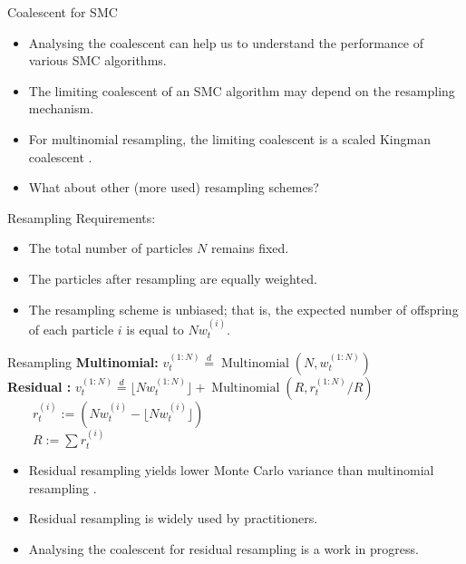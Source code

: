 \documentclass[aspectratio=169]{beamer}
\theoremstyle{definition}
\newcommand{\eqdist}{\overset{d}{=}}
\newcommand{\vt}[2][t]{v_{#1}^{(#2)}}
\newcommand{\wt}[2][t]{w_{#1}^{(#2)}}
\begin{document}
\begin{frame}{Coalescent for SMC}
\begin{itemize}
\item Analysing the coalescent can help us to understand the performance of various SMC algorithms.
\item The limiting coalescent of an SMC algorithm may depend on the resampling mechanism.
\item For multinomial resampling, the limiting coalescent is a scaled Kingman coalescent \cite{koskela2018}.
\item What about other (more used) resampling schemes?
\end{itemize}
\end{frame}

\begin{frame}{Resampling}
Requirements:\\[12pt]
\begin{itemize}
\item The total number of particles $N$ remains fixed. 
\item The particles after resampling are equally weighted. 
\item The resampling scheme is unbiased; that is, the expected number of offspring of each particle $i$ is equal to $N\wt{i}$.
\end{itemize}
\end{frame}

\begin{frame}{Resampling}
\textbf{Multinomial:}
$\vt{1:N} \eqdist \operatorname{Multinomial}(N, \wt{1:N})$\\[12pt]
\pause
\textbf{Residual \cite{liu1998}:}
$\vt{1:N} \eqdist \lfloor N \wt{1:N} \rfloor +  \operatorname{Multinomial}(R, r_t^{(1:N)}/R)$\\[7pt]
$\qquad r_t^{(i)} := (N \wt{i} - \lfloor N \wt{i}\rfloor)$\\[7pt]
$\qquad R:= \sum r_t^{(i)}$\\[12pt]
\pause
\begin{itemize}
\item Residual resampling yields lower Monte Carlo variance than multinomial resampling \cite{douc2005}.
\item Residual resampling is widely used by practitioners.
\item Analysing the coalescent for residual resampling is a work in progress.
\end{itemize}
\end{frame}
\end{document}
